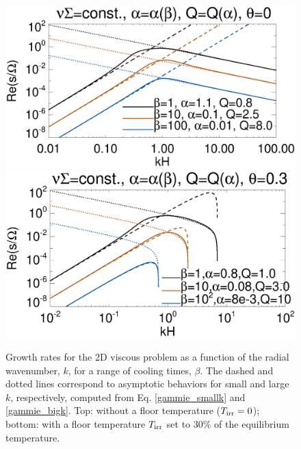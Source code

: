 \begin{figure}
  \includegraphics[width=\linewidth,clip=true,trim=0cm 2cm 0cm
    0.0cm]{figures/viscsg_modes}\\
  \includegraphics[width=\linewidth,clip=true,trim=0cm 0cm 0.cm
    0.0cm]{figures/viscsg_modes_theta0d3}
  \caption{Growth rates for the 2D viscous problem as a function of
    the radial wavenumber, $k$, for a range of cooling times, 
    $\beta$. The dashed and dotted lines correspond to asymptotic
    behaviors for small and large $k$, respectively, computed from
    Eq. \ref{gammie_smallk} and \ref{gammie_bigk}. Top: without
    a floor temperature ($T_\mathrm{irr} = 0$); bottom: with a floor
    temperature $T_\mathrm{irr}$ set to $30\%$ of the equilibrium temperature.   
    \label{gammie_rate_plot}}
\end{figure}

